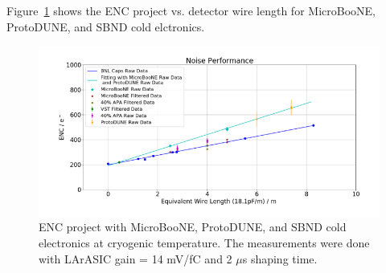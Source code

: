\label{sec:appendix}

Figure~\ref{fig:noise_otherExps} shows the ENC project vs. detector wire length for 
MicroBooNE, ProtoDUNE, and SBND cold elctronics. 
\begin{figure}[h!]
\centering
  \includegraphics[width=1.0\linewidth]{figures/noise_otherExps.png}
  \caption{ENC project with MicroBooNE, ProtoDUNE, and SBND cold electronics at cryogenic temperature. The measurements were done
with LArASIC gain = 14 mV/fC and 2 $\mu$s shaping time.}
  \label{fig:noise_otherExps}
\end{figure}

